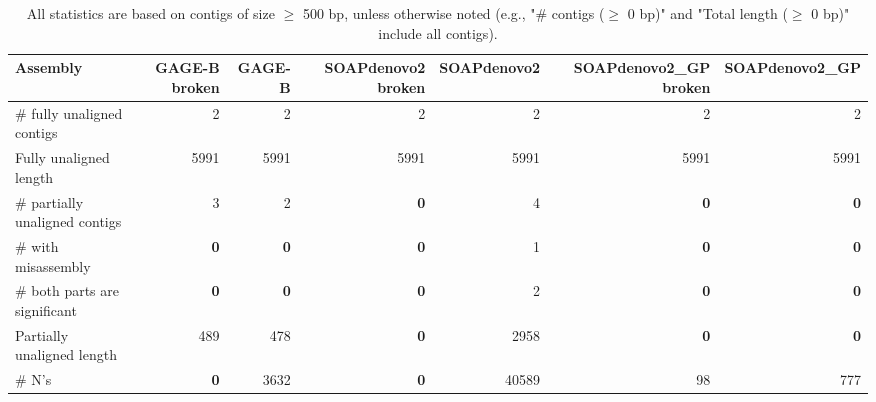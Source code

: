 \documentclass[12pt,a4paper]{article}
\begin{document}
\begin{table}[ht]
\begin{center}
\caption{All statistics are based on contigs of size $\geq$ 500 bp, unless otherwise noted (e.g., "\# contigs ($\geq$ 0 bp)" and "Total length ($\geq$ 0 bp)" include all contigs).}
\begin{tabular}{|l*{6}{|r}|}
\hline
Assembly & GAGE-B broken & GAGE-B & SOAPdenovo2 broken & SOAPdenovo2 & SOAPdenovo2\_GP broken & SOAPdenovo2\_GP \\ \hline
\# fully unaligned contigs & 2 & 2 & 2 & 2 & 2 & 2 \\ \hline
Fully unaligned length & 5991 & 5991 & 5991 & 5991 & 5991 & 5991 \\ \hline
\# partially unaligned contigs & 3 & 2 & {\bf 0} & 4 & {\bf 0} & {\bf 0} \\ \hline
\hspace{5mm}\# with misassembly & {\bf 0} & {\bf 0} & {\bf 0} & 1 & {\bf 0} & {\bf 0} \\ \hline
\hspace{5mm}\# both parts are significant & {\bf 0} & {\bf 0} & {\bf 0} & 2 & {\bf 0} & {\bf 0} \\ \hline
Partially unaligned length & 489 & 478 & {\bf 0} & 2958 & {\bf 0} & {\bf 0} \\ \hline
\# N's & {\bf 0} & 3632 & {\bf 0} & 40589 & 98 & 777 \\ \hline
\end{tabular}
\end{center}
\end{table}
\end{document}
